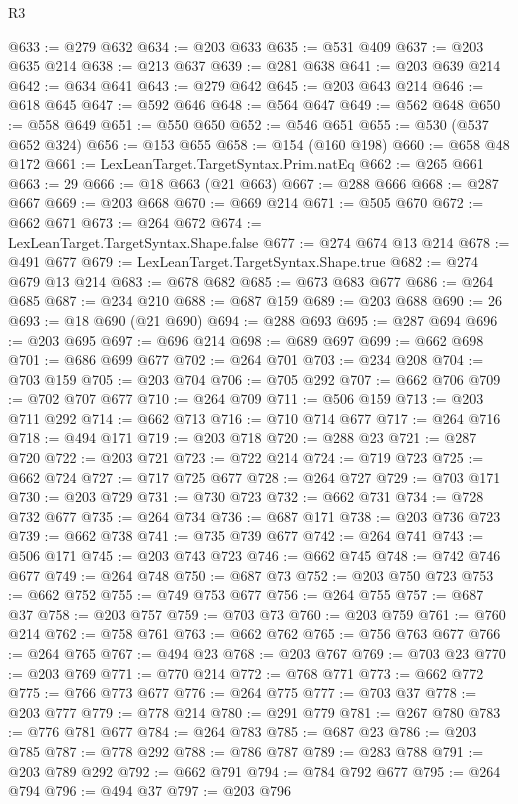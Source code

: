 \begin{lexlean}{R3}
\begin{coremodule}
@633 := @279 @632
@634 := @203 @633
@635 := @531 @409
@637 := @203 @635 @214
@638 := @213 @637
@639 := @281 @638
@641 := @203 @639 @214
@642 := @634 @641
@643 := @279 @642
@645 := @203 @643 @214
@646 := @618 @645
@647 := @592 @646
@648 := @564 @647
@649 := @562 @648
@650 := @558 @649
@651 := @550 @650
@652 := @546 @651
@655 := @530 (@537 @652 @324)
@656 := @153 @655
@658 := @154 (@160 @198)
@660 := @658 @48 @172
@661 := LexLeanTarget.TargetSyntax.Prim.natEq
@662 := @265 @661
@663 := 29
@666 := @18 @663 (@21 @663)
@667 := @288 @666
@668 := @287 @667
@669 := @203 @668
@670 := @669 @214
@671 := @505 @670
@672 := @662 @671
@673 := @264 @672
@674 := LexLeanTarget.TargetSyntax.Shape.false
@677 := @274 @674 @13 @214
@678 := @491 @677
@679 := LexLeanTarget.TargetSyntax.Shape.true
@682 := @274 @679 @13 @214
@683 := @678 @682
@685 := @673 @683 @677
@686 := @264 @685
@687 := @234 @210
@688 := @687 @159
@689 := @203 @688
@690 := 26
@693 := @18 @690 (@21 @690)
@694 := @288 @693
@695 := @287 @694
@696 := @203 @695
@697 := @696 @214
@698 := @689 @697
@699 := @662 @698
@701 := @686 @699 @677
@702 := @264 @701
@703 := @234 @208
@704 := @703 @159
@705 := @203 @704
@706 := @705 @292
@707 := @662 @706
@709 := @702 @707 @677
@710 := @264 @709
@711 := @506 @159
@713 := @203 @711 @292
@714 := @662 @713
@716 := @710 @714 @677
@717 := @264 @716
@718 := @494 @171
@719 := @203 @718
@720 := @288 @23
@721 := @287 @720
@722 := @203 @721
@723 := @722 @214
@724 := @719 @723
@725 := @662 @724
@727 := @717 @725 @677
@728 := @264 @727
@729 := @703 @171
@730 := @203 @729
@731 := @730 @723
@732 := @662 @731
@734 := @728 @732 @677
@735 := @264 @734
@736 := @687 @171
@738 := @203 @736 @723
@739 := @662 @738
@741 := @735 @739 @677
@742 := @264 @741
@743 := @506 @171
@745 := @203 @743 @723
@746 := @662 @745
@748 := @742 @746 @677
@749 := @264 @748
@750 := @687 @73
@752 := @203 @750 @723
@753 := @662 @752
@755 := @749 @753 @677
@756 := @264 @755
@757 := @687 @37
@758 := @203 @757
@759 := @703 @73
@760 := @203 @759
@761 := @760 @214
@762 := @758 @761
@763 := @662 @762
@765 := @756 @763 @677
@766 := @264 @765
@767 := @494 @23
@768 := @203 @767
@769 := @703 @23
@770 := @203 @769
@771 := @770 @214
@772 := @768 @771
@773 := @662 @772
@775 := @766 @773 @677
@776 := @264 @775
@777 := @703 @37
@778 := @203 @777
@779 := @778 @214
@780 := @291 @779
@781 := @267 @780
@783 := @776 @781 @677
@784 := @264 @783
@785 := @687 @23
@786 := @203 @785
@787 := @778 @292
@788 := @786 @787
@789 := @283 @788
@791 := @203 @789 @292
@792 := @662 @791
@794 := @784 @792 @677
@795 := @264 @794
@796 := @494 @37
@797 := @203 @796

\end{coremodule}
\end{lexlean}
